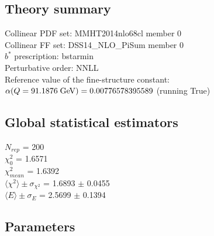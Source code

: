 \documentclass[
]{article}
\begin{document}
\hypertarget{theory-summary}{%
\subsection{Theory summary}\label{theory-summary}}

Collinear PDF set: MMHT2014nlo68cl member 0\\
Collinear FF set: DSS14\_NLO\_PiSum member 0\\
\(b^*\) prescription: bstarmin\\
Perturbative order: NNLL\\
Reference value of the fine-structure constant:
\(\alpha(Q = 91.1876\;{\rm GeV}) = 0.00776578395589\) (running True)

\hypertarget{global-statistical-estimators}{%
\subsection{Global statistical
estimators}\label{global-statistical-estimators}}

\(N_{rep}\) = 200\\
\(\chi_{0}^2\) = 1.6571\\
\(\chi_{mean}^2\) = 1.6392\\
\(\langle\chi^2\rangle \pm \sigma_{\chi^2}\) = 1.6893 \(\pm\) 0.0455\\
\(\langle E \rangle \pm \sigma_{E}\) = 2.5699 \(\pm\) 0.1394

\hypertarget{parameters}{%
\subsection{Parameters}\label{parameters}}
\end{document}
